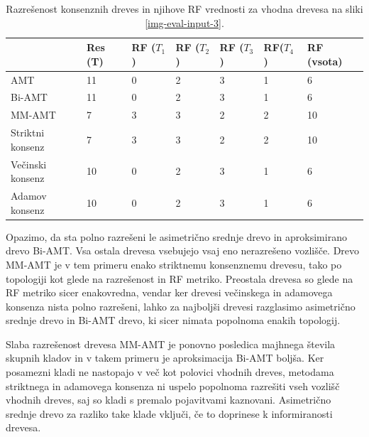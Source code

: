 \documentclass[a4paper, 12pt]{book}
\begin{document}
\begin{table}[h!]
	\begin{center}
	{\footnotesize
	\begin{tabular}{ l| l | l | l | l | l | l }
	~                & Res (T)      & RF ($T_1$) & RF ($T_2$)       & RF ($T_3$) & RF($T_4$) & RF (vsota) \\ \hline
	AMT              & 11          & 0          & 2                & 3          & 1         & 6          \\ \hline
	Bi-AMT           & 11          & 0          & 2                & 3          & 1         & 6          \\ \hline
	MM-AMT           & 7           & 3          & 3                & 2          & 2         & 10         \\ \hline
	Striktni konsenz & 7           & 3          & 3                & 2          & 2         & 10         \\ \hline
	Večinski konsenz & 10          & 0          & 2                & 3          & 1         & 6          \\ \hline
	Adamov konsenz   & 10          & 0          & 2                & 3          & 1         & 6          \\ \hline
	\end{tabular}
	\caption{Razrešenost konsenznih dreves in njihove RF vrednosti za vhodna drevesa na sliki \ref{img-eval-input-3}.}
	}
	\label{table-eval-3}
	\end{center}		
\end{table}

Opazimo, da sta polno razrešeni le asimetrično srednje drevo in aproksimirano drevo Bi-AMT. Vsa ostala drevesa vsebujejo vsaj eno nerazrešeno vozlišče. Drevo MM-AMT je v tem primeru enako striktnemu konsenznemu drevesu, tako po topologiji kot glede na razrešenost in RF metriko. Preostala drevesa so glede na RF metriko sicer enakovredna, vendar ker drevesi večinskega in adamovega konsenza nista polno razrešeni, lahko za najboljši drevesi razglasimo asimetrično srednje drevo in Bi-AMT drevo, ki sicer nimata popolnoma enakih topologij.

Slaba razrešenost drevesa MM-AMT je ponovno posledica majhnega števila skupnih kladov in v takem primeru je aproksimacija Bi-AMT boljša. Ker posamezni kladi ne nastopajo v več kot polovici vhodnih dreves, metodama striktnega in adamovega konsenza ni uspelo popolnoma razrešiti vseh vozlišč vhodnih dreves, saj so kladi s premalo pojavitvami kaznovani. Asimetrično srednje drevo za razliko take klade vključi, če to doprinese k informiranosti drevesa.
\end{document}
